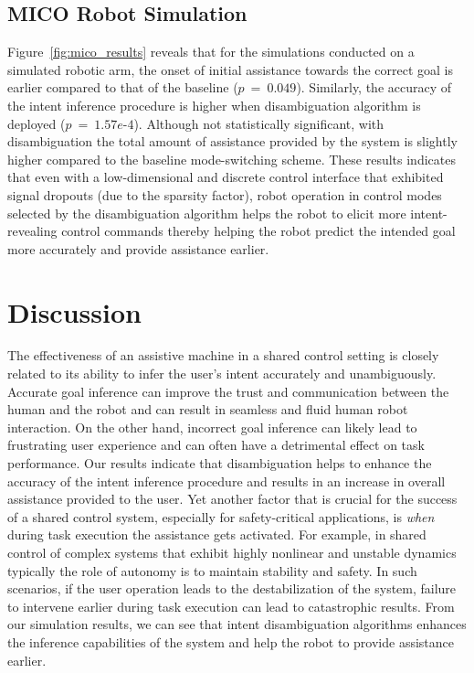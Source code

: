 \documentclass[conference]{IEEEtran}
\begin{document}
\subsection{MICO Robot Simulation}
Figure~\ref{fig:mico_results} reveals that for the simulations conducted on a simulated robotic arm, the onset of initial assistance towards the correct goal is earlier compared to that of the baseline ($p~=~0.049$). Similarly, the accuracy of the intent inference procedure is higher when disambiguation algorithm is deployed ($p~=~1.57e$-$4$). Although not statistically significant, with disambiguation the total amount of assistance provided by the system is slightly higher compared to the baseline mode-switching scheme. These results indicates that even with a low-dimensional and discrete control interface that exhibited signal dropouts (due to the sparsity factor), robot operation in control modes selected by the disambiguation algorithm helps the robot to elicit more intent-revealing control commands thereby helping the robot predict the intended goal more accurately and provide assistance earlier. 
\section{Discussion}\label{sec:discussions}

The effectiveness of an assistive machine in a shared control setting is closely related to its ability to infer the user's intent accurately and unambiguously. Accurate goal inference can improve the trust and communication between the human and the robot and can result in seamless and fluid human robot interaction. On the other hand, incorrect goal inference can likely lead to frustrating user experience and can often have a detrimental effect on task performance. Our results indicate that disambiguation helps to enhance the accuracy of the intent inference procedure and results in an increase in overall assistance provided to the user. Yet another factor that is crucial for the success of a shared control system, especially for safety-critical applications, is \textit{when} during task execution the assistance gets activated. For example, in shared control of complex systems that exhibit highly nonlinear and unstable dynamics typically the role of autonomy is to maintain stability and safety. In such scenarios, if the user operation leads to the destabilization of the system, failure to intervene earlier during task execution can lead to catastrophic results. From our simulation results, we can see that intent disambiguation algorithms enhances the inference capabilities of the system and help the robot to provide assistance earlier.
\end{document}
